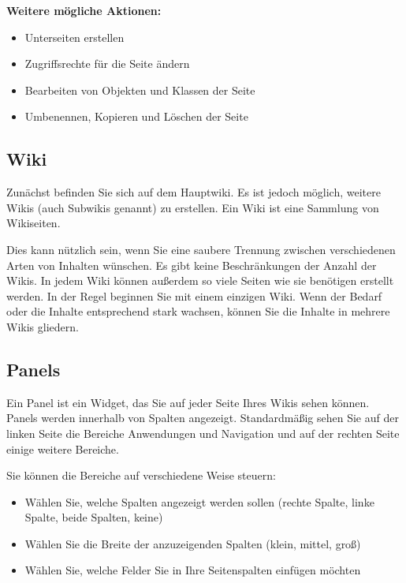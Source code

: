 \documentclass[
  letterpaper,
  DIV=11,
  numbers=noendperiod]{scrreprt}
\providecommand{\tightlist}{%
  \setlength{\itemsep}{0pt}\setlength{\parskip}{0pt}}\usepackage{longtable,booktabs,array}
\begin{document}
\textbf{Weitere mögliche Aktionen:}

\begin{itemize}
\tightlist
\item
  Unterseiten erstellen
\item
  Zugriffsrechte für die Seite ändern
\item
  Bearbeiten von Objekten und Klassen der Seite
\item
  Umbenennen, Kopieren und Löschen der Seite
\end{itemize}

\subsection{Wiki}\label{wiki}

Zunächst befinden Sie sich auf dem Hauptwiki. Es ist jedoch möglich,
weitere Wikis (auch Subwikis genannt) zu erstellen. Ein Wiki ist eine
Sammlung von Wikiseiten.

Dies kann nützlich sein, wenn Sie eine saubere Trennung zwischen
verschiedenen Arten von Inhalten wünschen. Es gibt keine Beschränkungen
der Anzahl der Wikis. In jedem Wiki können außerdem so viele Seiten wie
sie benötigen erstellt werden. In der Regel beginnen Sie mit einem
einzigen Wiki. Wenn der Bedarf oder die Inhalte entsprechend stark
wachsen, können Sie die Inhalte in mehrere Wikis gliedern.

\subsection{Panels}\label{panels}

Ein Panel ist ein Widget, das Sie auf jeder Seite Ihres Wikis sehen
können. Panels werden innerhalb von Spalten angezeigt. Standardmäßig
sehen Sie auf der linken Seite die Bereiche Anwendungen und Navigation
und auf der rechten Seite einige weitere Bereiche.

Sie können die Bereiche auf verschiedene Weise steuern:

\begin{itemize}
\tightlist
\item
  Wählen Sie, welche Spalten angezeigt werden sollen (rechte Spalte,
  linke Spalte, beide Spalten, keine)
\item
  Wählen Sie die Breite der anzuzeigenden Spalten (klein, mittel, groß)
\item
  Wählen Sie, welche Felder Sie in Ihre Seitenspalten einfügen möchten
\end{itemize}
\end{document}
